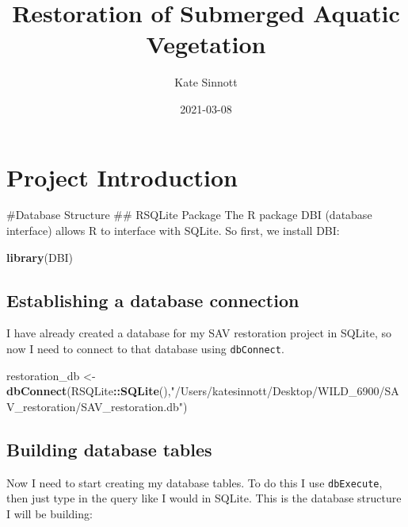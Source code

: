\documentclass[
]{book}
\title{Restoration of Submerged Aquatic Vegetation}
\author{Kate Sinnott}
\date{2021-03-08}
\newenvironment{Shaded}{\begin{snugshade}}{\end{snugshade}}
\newcommand{\KeywordTok}[1]{\textcolor[rgb]{0.13,0.29,0.53}{\textbf{#1}}}
\newcommand{\NormalTok}[1]{#1}
\newcommand{\OperatorTok}[1]{\textcolor[rgb]{0.81,0.36,0.00}{\textbf{#1}}}
\newcommand{\StringTok}[1]{\textcolor[rgb]{0.31,0.60,0.02}{#1}}
\begin{document}
\maketitle

{
\setcounter{tocdepth}{1}
\tableofcontents
}
\hypertarget{project-introduction}{%
\chapter{Project Introduction}\label{project-introduction}}

\#Database Structure
\#\# RSQLite Package
The R package DBI (database interface) allows R to interface with SQLite. So first,
we install DBI:

\begin{Shaded}
\begin{Highlighting}[]
\KeywordTok{library}\NormalTok{(DBI)}
\end{Highlighting}
\end{Shaded}

\hypertarget{establishing-a-database-connection}{%
\section{Establishing a database connection}\label{establishing-a-database-connection}}

I have already created a database for my SAV restoration project in SQLite,
so now I need to connect to that database using \texttt{dbConnect}.

\begin{Shaded}
\begin{Highlighting}[]
\NormalTok{restoration_db <-}\StringTok{ }\KeywordTok{dbConnect}\NormalTok{(RSQLite}\OperatorTok{::}\KeywordTok{SQLite}\NormalTok{(),}\StringTok{"/Users/katesinnott/Desktop/WILD_6900/SAV_restoration/SAV_restoration.db"}\NormalTok{)}
\end{Highlighting}
\end{Shaded}

\hypertarget{building-database-tables}{%
\section{Building database tables}\label{building-database-tables}}

Now I need to start creating my database tables. To do this I use \texttt{dbExecute}, then
just type in the query like I would in SQLite. This is the database structure I will
be building:
\end{document}
